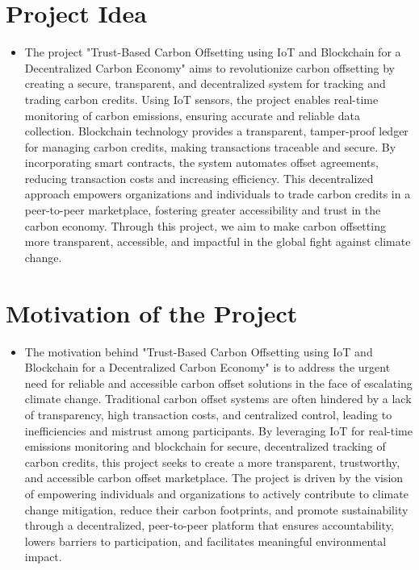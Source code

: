 \documentclass[oneside,a4paper,12pt]{book}
\begin{document}
\section{Project Idea}
\begin{itemize}
    \item The project "Trust-Based Carbon Offsetting using IoT and Blockchain for a Decentralized Carbon Economy" aims to revolutionize carbon offsetting by creating a secure, transparent, and decentralized system for tracking and trading carbon credits. Using IoT sensors, the project enables real-time monitoring of carbon emissions, ensuring accurate and reliable data collection. Blockchain technology provides a transparent, tamper-proof ledger for managing carbon credits, making transactions traceable and secure. By incorporating smart contracts, the system automates offset agreements, reducing transaction costs and increasing efficiency. This decentralized approach empowers organizations and individuals to trade carbon credits in a peer-to-peer marketplace, fostering greater accessibility and trust in the carbon economy. Through this project, we aim to make carbon offsetting more transparent, accessible, and impactful in the global fight against climate change.
\end{itemize}

\section{Motivation of the Project}  
\begin{itemize}
\item The motivation behind "Trust-Based Carbon Offsetting using IoT and Blockchain for a Decentralized Carbon Economy" is to address the urgent need for reliable and accessible carbon offset solutions in the face of escalating climate change. Traditional carbon offset systems are often hindered by a lack of transparency, high transaction costs, and centralized control, leading to inefficiencies and mistrust among participants. By leveraging IoT for real-time emissions monitoring and blockchain for secure, decentralized tracking of carbon credits, this project seeks to create a more transparent, trustworthy, and accessible carbon offset marketplace. The project is driven by the vision of empowering individuals and organizations to actively contribute to climate change mitigation, reduce their carbon footprints, and promote sustainability through a decentralized, peer-to-peer platform that ensures accountability, lowers barriers to participation, and facilitates meaningful environmental impact.
\end{itemize}
\end{document}

